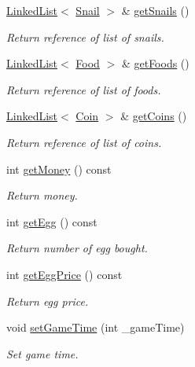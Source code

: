 \begin{DoxyCompactItemize}
\mbox{\hyperlink{class_linked_list}{Linked\+List}}$<$ \mbox{\hyperlink{class_snail}{Snail}} $>$ \& \mbox{\hyperlink{class_aquarium_adae17992a9b26d6918b96159a929d3eb}{get\+Snails}} ()
\begin{DoxyCompactList}\small\item\em Return reference of list of snails. \end{DoxyCompactList}\item 
\mbox{\hyperlink{class_linked_list}{Linked\+List}}$<$ \mbox{\hyperlink{class_food}{Food}} $>$ \& \mbox{\hyperlink{class_aquarium_a919dd5ccffd5fe1469544c74b5f26ee7}{get\+Foods}} ()
\begin{DoxyCompactList}\small\item\em Return reference of list of foods. \end{DoxyCompactList}\item 
\mbox{\hyperlink{class_linked_list}{Linked\+List}}$<$ \mbox{\hyperlink{class_coin}{Coin}} $>$ \& \mbox{\hyperlink{class_aquarium_a2524ad6a6a267f58251a9edc514fab53}{get\+Coins}} ()
\begin{DoxyCompactList}\small\item\em Return reference of list of coins. \end{DoxyCompactList}\item 
int \mbox{\hyperlink{class_aquarium_a313caeabfcd5936c3982a6642b5c7e2f}{get\+Money}} () const
\begin{DoxyCompactList}\small\item\em Return money. \end{DoxyCompactList}\item 
int \mbox{\hyperlink{class_aquarium_afeeff766ee2f6e30127f287e8ff98094}{get\+Egg}} () const
\begin{DoxyCompactList}\small\item\em Return number of egg bought. \end{DoxyCompactList}\item 
int \mbox{\hyperlink{class_aquarium_ad35796994738d4b6f2d7ffd5660b52ef}{get\+Egg\+Price}} () const
\begin{DoxyCompactList}\small\item\em Return egg price. \end{DoxyCompactList}\item 
void \mbox{\hyperlink{class_aquarium_a93d5b161e95bf64fc36642d3ec93ca48}{set\+Game\+Time}} (int \+\_\+game\+Time)
\begin{DoxyCompactList}\small\item\em Set game time. \end{DoxyCompactList}\item 

\end{DoxyCompactItemize}
